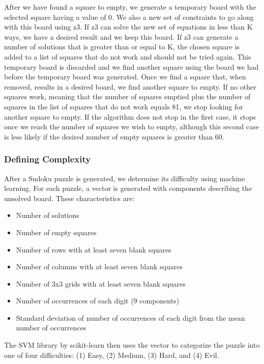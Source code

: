 After we have found a square to empty, we generate a temporary board
with the selected square  having a value of 0. We also a new set of
constraints to go along with this board using z3. If z3 can solve the
new set of equations in less than K ways, we have a desired result and
we keep this board. If z3 can generate a number of solutions that is
greater than or equal to K, the chosen square is added to a list of
squares that do not work and should not be tried again. This temporary
board is discarded and we find another square using the board we had
before the temporary board was generated. Once we find a square that,
when removed, results in a desired board, we find another square to
empty. If no other squares work, meaning that the number of squares
emptied plus the number of squares in the list of squares that do not
work equals 81, we stop looking for another square to empty. If the
algorithm does not stop in the first case, it stops once we reach the
number of squares we wish to empty, although this second case is less
likely if the desired number of empty squares is greater than 60.

\subsubsection{Defining Complexity}
After a Sudoku puzzle is generated, we determine its difficulty using
machine learning. For each puzzle, a vector is generated with
components describing the unsolved board. These characteristics are:

\singlespace
\begin{itemize}
\item Number of solutions
\item Number of empty squares
\item Number of rows with at least seven blank squares
\item Number of columns with at least seven blank squares
\item Number of 3x3 grids with at least seven blank squares
\item Number of occurrences of each digit (9 components)
\item Standard deviation of number of occurrences of each digit from the mean number of occurrences
\end{itemize}
\doublespace

The SVM library by scikit-learn then uses the vector to categorize the
puzzle into one of four difficulties: (1) Easy, (2) Medium, (3) Hard,
and (4) Evil.

